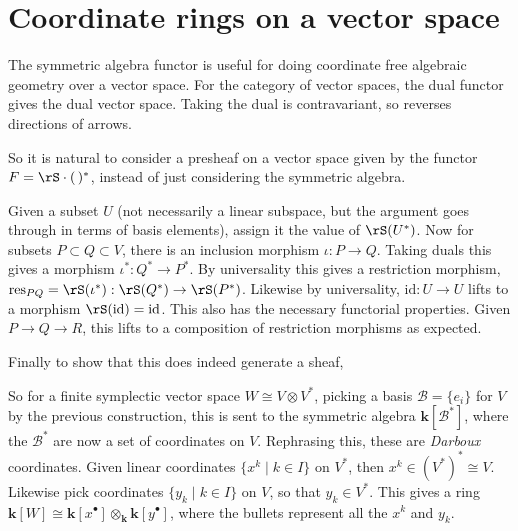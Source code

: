     \section{Coordinate rings on a vector space}
    
    The symmetric algebra functor is useful for doing coordinate free algebraic geometry over a vector space. For the category of vector spaces, the dual functor gives the dual vector space.  Taking the dual is contravariant, so reverses directions of arrows. 
    
    So it is natural to consider a presheaf on a vector space given by the functor \( F = \rS \cdot (\, )^*\), instead of just considering the symmetric algebra.
    
    

    
    
    
    Given a subset \(U\) (not necessarily a linear subspace, but the argument goes through in terms of basis elements), assign it the value of \( \rS(U^*)\). 
    Now for subsets \(P \subset Q \subset V \), there is an inclusion morphism \( \iota : P \rightarrow Q \).  Taking duals this gives a morphism \( \iota^* : Q^* \rightarrow P^*\). By universality this gives a restriction morphism, \( \mathrm{res}_{PQ} = \rS(\iota^*)  : \rS(Q^*) \rightarrow \rS(P^*)\). Likewise by universality, \( \mathrm{id} : U \rightarrow U \) lifts to a morphism \( \rS(\mathrm{id}) = \mathrm{id}\).
    This also has the necessary functorial properties. Given \( P \rightarrow Q \rightarrow R\), this lifts to a composition of restriction morphisms as expected. 
    
    
    
    Finally to show that this does indeed generate a sheaf, 
    
    So for a finite symplectic vector space \(W \cong V \otimes V^*\), 
    picking a basis \( \mathcal{B} = \{ e_i\}\) for \(V\) by the previous construction, this is sent to the symmetric algebra \( \mathbf{k}[\mathcal{B}^*]\), where the \( \mathcal{B}^*\) are now a set of coordinates on \(V\).  Rephrasing this, these are \emph{Darboux} coordinates. Given linear coordinates \(\{x^k\mid k\in I\} \) on \(V^*\), then \( x^k \in (V^*)^* \cong V\). Likewise pick coordinates \(\{y_k\mid k\in I\} \) on \(V\), so that \(y_k \in  V^*\). This gives a ring 
    \( \mathbf{k}[W] \cong \mathbf{k}[x^\bullet] \otimes_{\mathbf{k}} \mathbf{k} [y^\bullet]\), where the bullets represent all the \(x^k\) and \(y_k\). 
    
